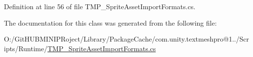 Definition at line 56 of file T\+M\+P\+\_\+\+Sprite\+Asset\+Import\+Formats.\+cs.



The documentation for this class was generated from the following file\+:\begin{DoxyCompactItemize}
\item 
O\+:/\+Git\+H\+U\+B\+M\+I\+N\+I\+P\+Roject/\+Library/\+Package\+Cache/com.\+unity.\+textmeshpro@1../\+Scripts/\+Runtime/\mbox{\hyperlink{_t_m_p___sprite_asset_import_formats_8cs}{T\+M\+P\+\_\+\+Sprite\+Asset\+Import\+Formats.\+cs}}\end{DoxyCompactItemize}
